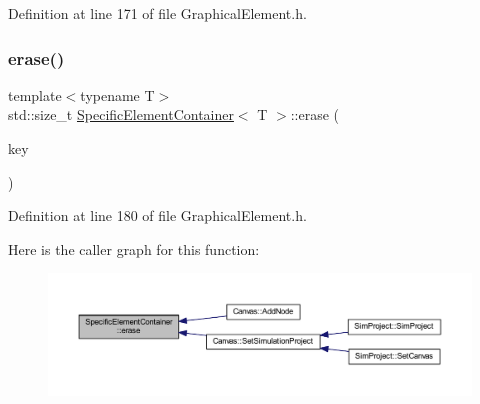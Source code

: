 Definition at line 171 of file Graphical\+Element.\+h.

\mbox{\label{class_specific_element_container_ae08e116cb7638a4d4d10a830185f502e}} 
\subsubsection{\texorpdfstring{erase()}{erase()}\hspace{0.1cm}{\footnotesize\ttfamily [1/2]}}
{\footnotesize\ttfamily template$<$typename T$>$ \\
std\+::size\+\_\+t \hyperlink{class_specific_element_container}{Specific\+Element\+Container}$<$ T $>$\+::erase (\begin{DoxyParamCaption}\item[{const \hyperlink{_graphical_element_8h_ade5fd6c85839a416577ff9de1605141e}{Element\+Key} \&}]{key }\end{DoxyParamCaption})\hspace{0.3cm}{\ttfamily [inline]}}



Definition at line 180 of file Graphical\+Element.\+h.

Here is the caller graph for this function\+:
\nopagebreak
\begin{figure}[H]
\begin{center}
\leavevmode
\includegraphics[width=350pt]{class_specific_element_container_ae08e116cb7638a4d4d10a830185f502e_icgraph}
\end{center}
\end{figure}
\mbox{\label{class_specific_element_container_a2d5e472917fc500714586e9c115f8da6}} 
